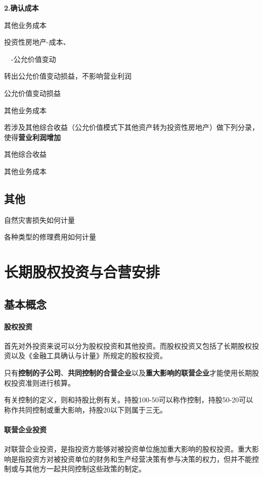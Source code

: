 \documentclass[UTF8,12pt]{ctexart}
\newenvironment{Dr}{%
	\begin{list}{}%
		{
			\setlength{\leftmargin}{2em}
			\setlength{\labelwidth}{2em}
			\setlength{\labelsep}{0pt}
			\setlength{\itemindent}{0pt}
			\setlength{\listparindent}{0pt}
			\setlength{\parsep}{0pt}
			\setlength{\topsep}{0pt}
		}
		\item[\textbf{借：}]
	}{%
	\end{list}
}
\newenvironment{Cr}{%
	\begin{list}{}%
		{
			\setlength{\leftmargin}{2em}
			\setlength{\labelwidth}{2em}
			\setlength{\labelsep}{0pt}
			\setlength{\itemindent}{0pt}
			\setlength{\listparindent}{0pt}
			\setlength{\parsep}{0pt}
			\setlength{\topsep}{0pt}
		}
		\item[\textbf{贷：}]
	}{%
	\end{list}
}
\numberwithin{equation}{section} %
\numberwithin{figure}{section}
\numberwithin{table}{section}
\begin{document}
	
	\textbf{2.确认成本}
	
	\begin{Dr}
		其他业务成本
	\end{Dr}
	\begin{Cr}
		投资性房地产-成本、
		
		\ \ -公允价值变动
	\end{Cr}
	
	
	转出公允价值变动损益，不影响营业利润
	
	\begin{Dr}
		公允价值变动损益
	\end{Dr}
	\begin{Cr}
		其他业务成本
	\end{Cr}
	
	若涉及其他综合收益（公允价值模式下其他资产转为投资性房地产）做下列分录，使得\textbf{营业利润增加}
	
	\begin{Dr}
		其他综合收益
	\end{Dr}
	\begin{Cr}
		其他业务成本
	\end{Cr}

	\subsection{其他}
	自然灾害损失如何计量
	
	各种类型的修理费用如何计量
	
	\newpage
	\section{长期股权投资与合营安排}
	\subsection{基本概念}
	\paragraph{股权投资}
	首先对外投资来说可以分为股权投资和其他投资。而股权投资又包括了长期股权投资以及《金融工具确认与计量》所规定的股权投资。
	
	只有\textbf{控制的子公司}、\textbf{共同控制的合营企业}以及\textbf{重大影响的联营企业}才能使用长期股权投资准则进行核算。
	
	有关控制的定义，则和持股比例有关。持股100-50可以称作控制，持股50-20可以称作共同控制或重大影响，持股20以下则属于三无。
	
	\paragraph{联营企业投资}
	对联营企业投资，是指投资方能够对被投资单位施加重大影响的股权投资。重大影响是指投资方对被投资单位的财务和生产经营决策有参与决策的权力，但并不能控制或与其他方一起共同控制这些政策的制定。
	
\end{document}
